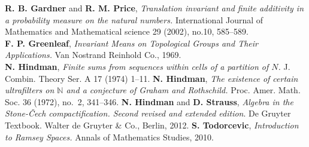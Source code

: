 \documentclass{jloganal}
\theoremstyle{definition}
\begin{document}
\begin{thebibliography}
   {\bf R. B. Gardner} and {\bf R. M. Price},
   {\it Translation invariant and finite additivity in a probability measure on the natural numbers.}
   International Journal of Mathematics and Mathematical science
   29 (2002), no.10, 585--589.\\
   {\bf F. P. Greenleaf},
   {\it Invariant Means on Topological Groups and Their Applications.}
   Van Nostrand Reinhold Co., 1969.\\
    {\bf N. Hindman},
    {\it Finite sums from sequences within cells of a partition of {$N$}.}
    J. Combin. Theory Ser. A
    17 (1974) 1--11.
    {\bf N. Hindman}, 
    {\it The existence of certain ultrafilters on $\mathbb N$ and a conjecture of Graham and Rothschild.}
    Proc. Amer. Math. Soc.
    36 (1972), no.~2, 341--346.
    {\bf N. Hindman} and {\bf D. Strauss},
    {\it Algebra in the {S}tone-\v {C}ech compactification. Second revised and extended edition}.
    De Gruyter Textbook. Walter de Gruyter \& Co., Berlin, 2012.
    {\bf S. Todorcevic},
    {\it Introduction to Ramsey Spaces.}
    Annals of Mathematics Studies, 2010.
\end{thebibliography}
\end{document}
